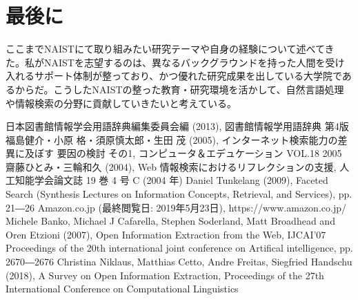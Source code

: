 \documentclass[a4j,10pt, twocolumn]{jarticle} \usepackage[dvipdfmx]{graphicx} \usepackage{amssymb} \usepackage{amsmath}
\begin{document}
\section{最後に}
ここまでNAISTにて取り組みたい研究テーマや自身の経験について述べてきた。私がNAISTを志望するのは、異なるバックグラウンドを持った人間を受け入れるサポート体制が整っており、かつ優れた研究成果を出している大学院であるからだ。こうしたNAISTの整った教育・研究環境を活かして、自然言語処理や情報検索の分野に貢献していきたいと考えている。

\begin{thebibliography}{9}
  日本図書館情報学会用語辞典編集委員会編 (2013), 図書館情報学用語辞典 第4版
   福島健介・小原 格・須原慎太郎・生田 茂 (2005), インターネット検索能力の差異に及ぼす 要因の検討 その1, コンピュータ＆エデュケーション VOL.18 2005
   齋藤ひとみ・三輪和久 (2004),  Web 情報検索におけるリフレクションの支援, 人工知能学会論文誌 19 巻 4 号 C (2004 年)
  Daniel Tunkelang (2009), Faceted Search (Synthesis Lectures on Information Concepts, Retrieval, and Services), pp. 21―26
  Amazon.co.jp (最終閲覧日: 2019年5月23日), https://www.amazon.co.jp/
  Michele Banko, Michael J Cafarella, Stephen Soderland, Matt Broadhead and Oren Etzioni (2007), Open Information Extraction from the Web, IJCAI'07 Proceedings of the 20th international joint conference on Artifical intelligence, pp. 2670―2676 
  Christina Niklaus, Matthias Cetto, Andre Freitas, Siegfried Handschu (2018), A Survey on Open Information Extraction, Proceedings of the 27th International Conference on Computational Linguistics
\end{thebibliography}
\end{document}
